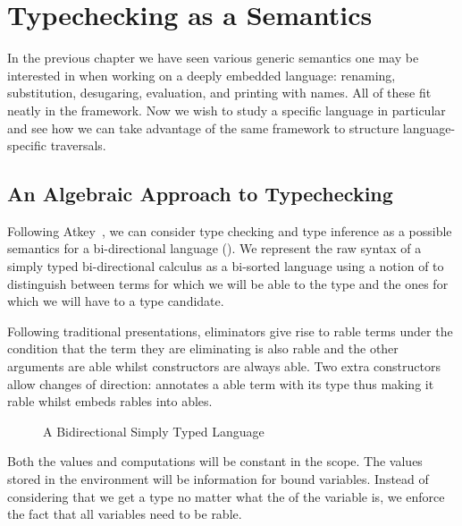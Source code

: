 \chapter{Typechecking as a Semantics}

In the previous chapter we have seen various generic semantics one may be interested in
when working on a deeply embedded language: renaming, substitution, desugaring,
evaluation, and printing with names. All of these fit neatly in the 
framework. Now we wish to study a specific language in particular and see how we can
take advantage of the same framework to structure language-specific traversals.

\section{An Algebraic Approach to Typechecking}\label{section:typechecking}

Following Atkey~\citeyear{atkey2015algebraic}, we can consider type checking
and type inference as a possible semantics for a bi-directional language
(\cite{pierce2000local}). We represent the raw syntax of a simply typed bi-directional
calculus as a bi-sorted language using a notion of  to distinguish between
terms for which we will be able to  the type and the ones for which we will
have to  a type candidate.

Following traditional presentations, eliminators give rise to rable
terms under the condition that the term they are eliminating is also rable
and the other arguments are able whilst constructors are always able.
Two extra constructors allow changes of direction:  annotates a able
term with its type thus making it rable whilst  embeds
rables into ables.

\begin{figure}[h]
\caption{A Bidirectional Simply Typed Language}
\end{figure}

Both the values and computations will be constant in the scope. The values stored
in the environment will be  information for bound variables. Instead of
considering that we get a type no matter what the  of the variable is,
we enforce the fact that all variables need to be rable.

